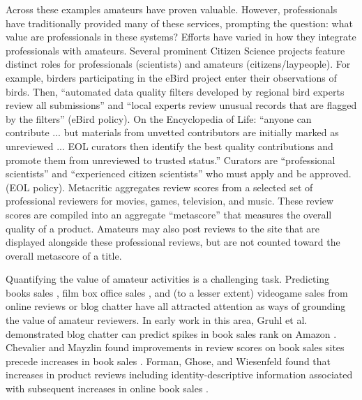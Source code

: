 \documentclass[letterpaper]{article}
\begin{document}
Across these examples amateurs have proven valuable. 
However, professionals have traditionally provided many of these services, prompting the question: what value are professionals in these systems?
Efforts have varied in how they integrate professionals with amateurs.
Several prominent Citizen Science projects feature distinct roles for professionals (scientists) and amateurs (citizens/laypeople). For example, birders participating in the eBird project enter their observations of birds. Then, ``automated data quality filters developed by regional bird experts review all submissions'' and ``local experts review unusual records that are flagged by the filters'' (eBird policy).
On the Encyclopedia of Life: ``anyone can contribute ... but materials from unvetted contributors are initially marked as unreviewed ... EOL curators then identify the best quality contributions and promote them from unreviewed to trusted status.'' Curators are ``professional scientists'' and ``experienced citizen scientists'' who must apply and be approved. (EOL policy).
Metacritic aggregates review scores from a selected set of professional reviewers for movies, games, television, and music. These review scores are compiled into an aggregate ``metascore'' that measures the overall quality of a product. Amateurs may also post reviews to the site that are displayed alongside these professional reviews, but are not counted toward the overall metascore of a title.

Quantifying the value of amateur activities is a challenging task. 
Predicting books sales \cite{gruhl2005predictive,chevalier2003effect}, film box office sales \cite{dellarocas2007exploring,yu2012mining}, and (to a lesser extent) videogame sales \cite{ehrenfeld2011predicting,marcoux2009hybrid} from online reviews or blog chatter have all attracted attention as ways of grounding the value of amateur reviewers. In early work in this area, Gruhl et al. demonstrated blog chatter can predict spikes in book sales rank on Amazon \cite{gruhl2005predictive}. Chevalier and Mayzlin found improvements in review scores on book sales sites precede increases in book sales \cite{chevalier2003effect}. Forman, Ghose, and Wiesenfeld found that increases in product reviews including identity-descriptive information associated with subsequent increases in online book sales \cite{ghose2007designing}.
\end{document}
